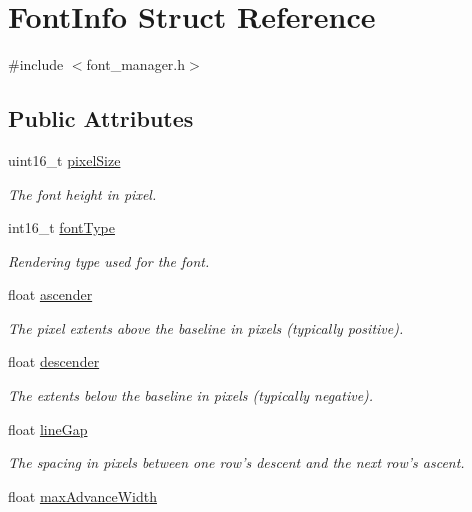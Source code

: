 \hypertarget{struct_font_info}{\section{Font\+Info Struct Reference}
\label{struct_font_info}
}


{\ttfamily \#include $<$font\+\_\+manager.\+h$>$}

\subsection*{Public Attributes}
\begin{DoxyCompactItemize}
\item 
uint16\+\_\+t \hyperlink{struct_font_info_ac105b7c9e6b92868d8629db40d8997f8}{pixel\+Size}
\begin{DoxyCompactList}\small\item\em The font height in pixel. \end{DoxyCompactList}\item 
int16\+\_\+t \hyperlink{struct_font_info_a81891cdae4776065b7c4e3ff2160825e}{font\+Type}
\begin{DoxyCompactList}\small\item\em Rendering type used for the font. \end{DoxyCompactList}\item 
float \hyperlink{struct_font_info_a6425ef6a67acb7b423d630576d22241e}{ascender}
\begin{DoxyCompactList}\small\item\em The pixel extents above the baseline in pixels (typically positive). \end{DoxyCompactList}\item 
float \hyperlink{struct_font_info_a9222af5ae7aee891a317ef38a4126d5b}{descender}
\begin{DoxyCompactList}\small\item\em The extents below the baseline in pixels (typically negative). \end{DoxyCompactList}\item 
float \hyperlink{struct_font_info_a4395a1361246d87241ff19ecb7009dc9}{line\+Gap}
\begin{DoxyCompactList}\small\item\em The spacing in pixels between one row's descent and the next row's ascent. \end{DoxyCompactList}\item 
float \hyperlink{struct_font_info_a060968f05f5ae7795a0f8ca2e6fb15c2}{max\+Advance\+Width}

\end{DoxyCompactItemize}
